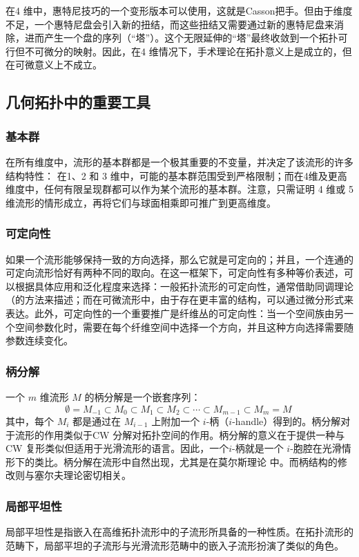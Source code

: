 在4 维中，惠特尼技巧的一个变形版本可以使用，这就是Casson把手。但由于维度不足，一个惠特尼盘会引入新的扭结，而这些扭结又需要通过新的惠特尼盘来消除，进而产生一个盘的序列（“塔”）。这个无限延伸的“塔”最终收敛到一个拓扑可行但不可微分的映射。因此，在4 维情况下，手术理论在拓扑意义上是成立的，但在可微意义上不成立。
\subsection{几何拓扑中的重要工具}
\subsubsection{基本群}
在所有维度中，流形的基本群都是一个极其重要的不变量，并决定了该流形的许多结构特性：
在1、2 和 3 维中，可能的基本群范围受到严格限制；而在4维及更高维度中，任何有限呈现群都可以作为某个流形的基本群。注意，只需证明 4 维或 5 维流形的情形成立，再将它们与球面相乘即可推广到更高维度。
\subsubsection{可定向性}
如果一个流形能够保持一致的方向选择，那么它就是可定向的；并且，一个连通的可定向流形恰好有两种不同的取向。在这一框架下，可定向性有多种等价表述，可以根据具体应用和泛化程度来选择：一般拓扑流形的可定向性，通常借助同调理论（的方法来描述；而在可微流形中，由于存在更丰富的结构，可以通过微分形式来表达。此外，可定向性的一个重要推广是纤维丛的可定向性：当一个空间族由另一个空间参数化时，需要在每个纤维空间中选择一个方向，并且这种方向选择需要随参数连续变化。
\subsubsection{柄分解}
一个 $m$ 维流形 $M$ 的柄分解是一个嵌套序列：
$$
\emptyset = M_{-1} \subset M_0 \subset M_1 \subset M_2 \subset \cdots \subset M_{m-1} \subset M_m = M~
$$
其中，每个 $M_i$ 都是通过在 $M_{i-1}$ 上附加一个 $i$-柄（$i$-handle）得到的。柄分解对于流形的作用类似于CW 分解对拓扑空间的作用。柄分解的意义在于提供一种与CW 复形类似但适用于光滑流形的语言。因此，一个$i$-柄就是一个 $i$-胞腔在光滑情形下的类比。柄分解在流形中自然出现，尤其是在莫尔斯理论 中。而柄结构的修改则与塞尔夫理论密切相关。
\subsubsection{局部平坦性}
局部平坦性是指嵌入在高维拓扑流形中的子流形所具备的一种性质。在拓扑流形的范畴下，局部平坦的子流形与光滑流形范畴中的嵌入子流形扮演了类似的角色。

